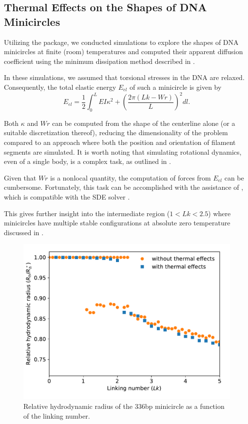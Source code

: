 \documentclass{doctoral}
\newcommand{\code}[1]{\texttt{\detokenize{#1}}}
\begin{document}
\subsection{Thermal Effects on the Shapes of DNA Minicircles}

Utilizing the \code{pychastic} package, we conducted simulations to explore the shapes of DNA minicircles at finite (room) temperatures and computed their apparent diffusion coefficient using the minimum dissipation method described in \textcite{Cichocki_2019}.

In these simulations, we assumed that torsional stresses in the DNA are relaxed.
Consequently, the total elastic energy $E_{el}$ of such a minicircle is given by
\begin{equation}
    E_{el} = \frac{1}{2} \int_0^L EI \kappa^2 + \left( \frac{2\pi (Lk - Wr)}{L} \right)^2 dl.
\end{equation}

Both $\kappa$ and $Wr$ can be computed from the shape of the centerline alone (or a suitable discretization thereof), reducing the dimensionality of the problem compared to an approach where both the position and orientation of filament segments are simulated.
It is worth noting that simulating rotational dynamics, even of a single body, is a complex task, as outlined in \textcite{Waszkiewicz_2023_pychastic}.

Given that $Wr$ is a nonlocal quantity, the computation of forces from $E_{el}$ can be cumbersome.
Fortunately, this task can be accomplished with the assistance of \code{jax.grad}, which is compatible with the SDE solver \code{pychastic}.

This gives further insight into the intermediate region ($1 < Lk < 2.5$) where minicircles have multiple stable configurations at absolute zero temperature discussed in \textcite{Waszkiewicz_2023_dna}.

\begin{figure}[htbp]
    \centering
    \includegraphics[height=0.5\linewidth]{figures/with_thermal_effects.pdf}
    \caption{Relative hydrodynamic radius of the 336bp minicircle as a function of the linking number.}
    \label{fig:thermalized_loops}
\end{figure}
\end{document}
